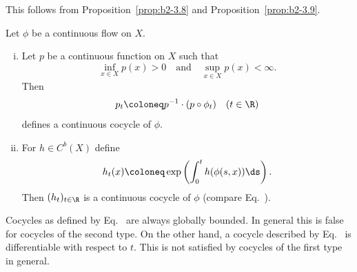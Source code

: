 This follows from Proposition~\ref{prop:b2-3.8} and Proposition~\ref{prop:b2-3.9}.
\begin{example}\label{ex:b2-3.11}
Let $\phi$ be a continuous flow on $X$.
\begin{enumerate}[(i), wide, labelindent=.25em]
\item \label{ex:b2-3.11-1}
Let $p$ be a continuous function on $X$ such that 
%
\[
	\inf_{x \in X} p(x) > 0 \quad \text{and} \quad \sup_{x \in X} p(x) < \infty.
\]
%
Then
\begin{equation}\label{eq:b2-3.13}
p_{t} \coloneq p^{-1} \cdot (p \circ \phi_{t}) \quad (t \in \R)
\end{equation}
defines a continuous cocycle of\/ $\phi$.
\item \label{ex:b2-3.11-2}
For $h \in C^{b}(X)$ define
\begin{equation}\label{eq:b2-3.14}
h_{t}(x) \coloneq \exp\left(\int_{0}^{t} h(\phi(s,x))  \ds \right).
\end{equation}
Then $(h_{t})_{t \in \R}$ is a continuous cocycle of\/ $\phi$ (compare Eq.~).
\end{enumerate}
\end{example}
Cocycles as defined by Eq.~ are always globally bounded.
In general this is false for cocycles of the second type.
On the other hand, a cocycle described by Eq.~ is differentiable with respect to $t$.
This is not satisfied by cocycles of the first type in general.

